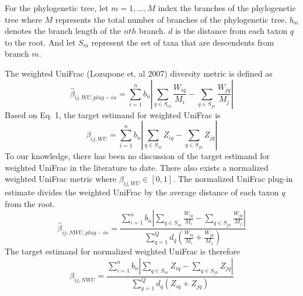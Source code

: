 \documentclass{article}
\begin{document}
For the phylogenetic tree, let $m = 1,..., M$ index the branches of the phylogenetic tree where $M$ represents the total number of branches of the phylogenetic tree. $b_m$ denotes the branch length of the $nth$ branch. $d$ is the distance from each taxon $q$ to the root. And let $S_m$ represent the set of taxa that are descendents from branch $m$.

The weighted UniFrac (Lozupone et. al 2007) diversity metric is defined as
\begin{equation}
    \hat{\beta}_{ij,WU,plug-in}=\sum_{i=1}^n b_n |\sum_{q \in S_{in}} \frac{W_{iq}}{M_i}-\sum_{q \in S_{jn}} \frac{W_{jq}}{M_j}|
\end{equation}
Based on Eq. 1, the target estimand for weighted UniFrac is
\begin{equation}
    \beta_{ij,WU}=\sum_{i=1}^n b_n |\sum_{q \in S_{in}} Z_{iq} -\sum_{q \in S_{jn}} Z_{jq}|
\end{equation}
To our knowledge, there has been no discussion of the target estimand for weighted UniFrac in the literature to date. There also exists a normalized weighted UniFrac metric where $\beta_{ij,WU} \in [0,1]$.  The normalized UniFrac plug-in estimate divides the weighted UniFrac by the average distance of each taxon $q$ from the root.
\begin{equation}\label{eq:plugin}
    \hat{\beta}_{ij,NWU,plug-in}=\frac{\sum_{i=1}^n b_n |\sum_{q \in S_{in}} \frac{W_{iq}}{M_i}-\sum_{q \in S_{jn}} \frac{W_{jq}}{M_j}|}{\sum_{q=1}^Q d_q (\frac{W_{iq}}{M_i}+\frac{W_{jq}}{M_j})}
\end{equation}
The target estimand for normalized weighted UniFrac is therefore
\begin{equation}
    \beta_{ij,NWU}=\frac{\sum_{i=1}^n b_n |\sum_{q \in S_{in}} Z_{iq}-\sum_{q \in S_{jn}} Z_{jq}|}{\sum_{q=1}^Q d_q (Z_{iq}+Z_{jq})}
\end{equation}
\end{document}
